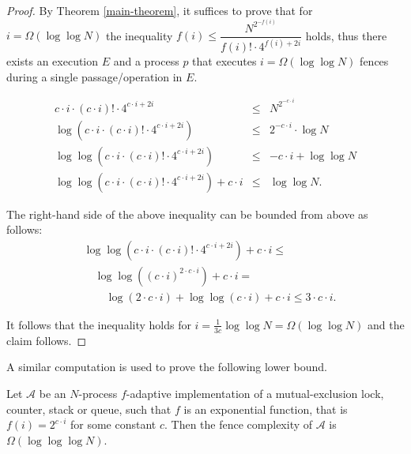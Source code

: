 \begin{proof}
	By Theorem \ref{main-theorem}, it suffices to prove that for $i = \Omega(\log \log N)$ the inequality $f(i) \leq \dfrac{N^{2^{-f(i)}}} {f(i)! \cdot 4^{f(i)+2i}}$ holds, thus there exists an execution $E$ and a process $p$ that executes $i = \Omega(\log \log N)$ fences during a single passage/operation in $E$.
	
	\begin{equation*}
		\begin{array}{rcl}
			c \cdot i \cdot (c \cdot i)! \cdot 4^{c \cdot i +2i} & \leq & {N^{2^{-c \cdot i}}} \\
			\log(c \cdot i \cdot (c \cdot i)! \cdot 4^{c \cdot i +2i}) & \leq & 2^{-c \cdot i}\cdot \log N \\
			\log \log(c \cdot i \cdot (c \cdot i)! \cdot 4^{c \cdot i +2i}) & \leq & -c \cdot i + \log \log N \\
			\log \log(c \cdot i \cdot (c \cdot i)! \cdot 4^{c \cdot i +2i}) + c \cdot i & \leq & \log \log N.
		\end{array}
	\end{equation*}
	
The right-hand side of the above inequality can be bounded from above as follows:
\begin{align*}
	& \log \log(c \cdot i \cdot (c \cdot i)! \cdot 4^{c \cdot i +2i}) + c \cdot i \leq \\
	& \quad \log \log((c \cdot i)^{2 \cdot c \cdot i}) + c \cdot i = \\
	& \qquad \log (2 \cdot c \cdot i) + \log \log(c \cdot i) + c \cdot i \leq 3 \cdot c \cdot i.
\end{align*}

	It follows that the inequality holds for $i = \frac{1}{3c}\log \log N = \Omega(\log \log N)$ and the claim follows.
\end{proof}

A similar computation is used to prove the following lower bound.

\begin{corollary}
\label{corollary-exp}
Let $\mathcal{A}$ be an  $N$-process $f$-adaptive implementation of a mutual-exclusion lock, counter, stack or queue, such that $f$ is an exponential function, that is $f(i) = 2^{c \cdot i}$ for some constant $c$. Then the fence complexity of $\mathcal{A}$ is $\Omega (\log \log \log N)$.
\end{corollary}

